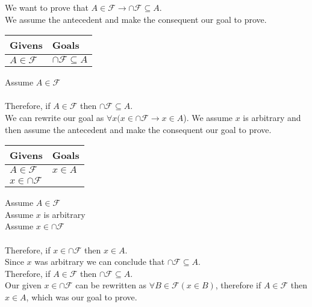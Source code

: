 \documentclass{article}
\newcommand{\n}{ \noindent }
\newcommand{\F}{\mathcal{F}}
\begin{document}
\n We want to prove that
$A \in \F \rightarrow \cap \F \subseteq A$. \\

\n We assume the antecedent and make the consequent our goal to prove. \\

\begin{table}[h]
\begin{tabular}{ll}
\hline
Givens & Goals   \\ \hline
$ A \in \F$  & $\cap \F \subseteq A$   \\ \hline
\end{tabular}
\end{table}

\n Assume $A \in \F$ \\
\indent [proof of $\cap \F \subseteq A$] \\
\n Therefore, if $A \in \F$ then $\cap \F \subseteq A$. \\

\n We can rewrite our goal as $\forall x(x \in \cap \F \rightarrow x \in A$). We assume $x$ is arbitrary and then assume the antecedent and make the consequent our goal to prove. \\

\begin{table}[h]
\begin{tabular}{ll}
\hline
Givens & Goals   \\ \hline
$ A \in \F$  & $x \in A$   \\ 
$x \in \cap \F$ & \\ \hline
\end{tabular}
\end{table}

\n Assume $A \in \F$ \\
\indent Assume $x$ is arbitrary \\
\indent \indent Assume $x \in \cap \F$ \\
\indent \indent \indent [proof of $x \in A$] \\
\indent \indent Therefore, if $x \in \cap \F$ then $x \in A$. \\
\indent Since $x$ was arbitrary we can conclude that $\cap \F \subseteq A$. \\
\n Therefore, if $A \in \F$ then $\cap \F \subseteq A$. \\

\n Our given $x \in \cap \F$ can be rewritten as $\forall B \in \F (x \in B)$, therefore if $A \in \F$ then $x \in A$, which was our goal to prove.
\end{document}
